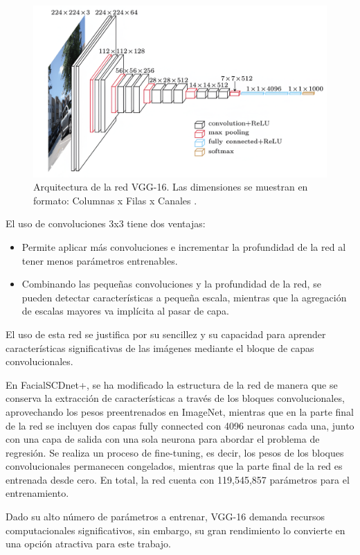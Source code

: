 \begin{figure}[h]
	\centering
	\includegraphics[scale=0.1]{imagenes/cap4/vgg-16.png}
	\caption[Arquitectura de la red VGG-16.]{Arquitectura de la red VGG-16. Las dimensiones se muestran en formato: Columnas x Filas x Canales \cite{66}.}
	\label{fig26}
\end{figure}

El uso de convoluciones 3x3 tiene dos ventajas:

\begin{itemize}
	\item Permite aplicar más convoluciones e incrementar la profundidad de la red al tener menos parámetros entrenables.
	\item Combinando las pequeñas convoluciones y la profundidad de la red, se pueden detectar características a pequeña escala, mientras que la agregación de escalas mayores va implícita al pasar de capa.
\end{itemize}

El uso de esta red se justifica por su sencillez y su capacidad para aprender características significativas de las imágenes mediante el bloque de capas convolucionales. 

En FacialSCDnet+, se ha modificado la estructura de la red de manera que se conserva la extracción de características a través de los bloques convolucionales, aprovechando los pesos preentrenados en ImageNet, mientras que en la parte final de la red se incluyen dos capas fully connected con 4096 neuronas cada una, junto con una capa de salida con una sola neurona para abordar el problema de regresión. Se realiza un proceso de fine-tuning, es decir, los pesos de los bloques convolucionales permanecen congelados, mientras que la parte final de la red es entrenada desde cero. En total, la red cuenta con 119,545,857 parámetros para el entrenamiento.

Dado su alto número de parámetros a entrenar, VGG-16 demanda recursos computacionales significativos, sin embargo, su gran rendimiento lo convierte en una opción atractiva para este trabajo.